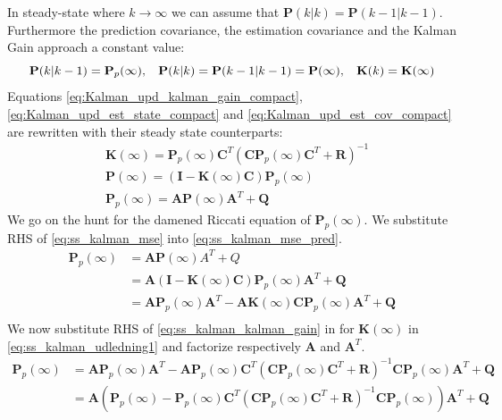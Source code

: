 In steady-state where $k \rightarrow \infty$ we can assume that $\textbf{P}(k|k) = \textbf{P}(k-1|k-1) $. Furthermore the prediction covariance, the estimation covariance and the Kalman Gain approach a constant value:
\begin{equation}
	\textbf{P}(k|k-1) =  \textbf{P}_p(\infty), \hspace{3mm} \textbf{P}(k|k) = \textbf{P}(k-1|k-1) = \textbf{P}(\infty),  \hspace{3mm} \textbf{K}(k) = \textbf{K}(\infty)
\end{equation}
Equations \cref{eq:Kalman_upd_kalman_gain_compact}, \cref{eq:Kalman_upd_est_state_compact} and \cref{eq:Kalman_upd_est_cov_compact} are rewritten with their steady state counterparts:
\begin{align}
	& \textbf{K}(\infty) = \textbf{P}_p(\infty) \textbf{C}^T (\textbf{C} \textbf{P}_p	(\infty) \textbf{C}^T + \textbf{R})^{-1} \label{eq:ss_kalman_kalman_gain} \\
	& \textbf{P}(\infty) = (\textbf{I} - \textbf{K}(\infty) \textbf{C}) \textbf{P}_p(\infty) \label{eq:ss_kalman_mse} \\
	& \textbf{P}_p(\infty) = \textbf{A}\textbf{P}(\infty)\textbf{A}^T + \textbf{Q} \label{eq:ss_kalman_mse_pred}
\end{align}
We go on the hunt for the damened Riccati equation of $\textbf{P}_p(\infty)$. We substitute RHS of \cref{eq:ss_kalman_mse} into \cref{eq:ss_kalman_mse_pred}.
\begin{equation}
	\begin{split}\label{eq:ss_kalman_udledning1}
		\textbf{P}_p(\infty) 	& = \textbf{A}\textbf{P}(\infty)A^T + Q \\
		& = \textbf{A} (\textbf{I}-\textbf{K}(\infty)\textbf{C}) \textbf{P}_p(\infty) \textbf{A}^T + \textbf{Q}\\
		& = \textbf{A} \textbf{P}_p(\infty) \textbf{A}^T - \textbf{A} \textbf{K}(\infty) \textbf{C} \textbf{P}_p(\infty)  \textbf{A}^T + \textbf{Q}\\
		\end{split}
\end{equation}
We now substitute RHS of \cref{eq:ss_kalman_kalman_gain} in for $\textbf{K}(\infty)$ in \cref{eq:ss_kalman_udledning1} and factorize respectively $\textbf{A}$ and $ \textbf{A}^T $.
\begin{equation}
	\begin{split}\label{eq:ss_kalman_udledning2}
		\textbf{P}_p(\infty) & = \textbf{A} \textbf{P}_p(\infty) \textbf{A}^T - \textbf{A} \textbf{P}_p(\infty) \textbf{C}^T (\textbf{C} \textbf{P}_p(\infty) \textbf{C}^T + \textbf{R})^{-1} \textbf{C} \textbf{P}_p(\infty) \textbf{A}^T + \textbf{Q}\\
		& = \textbf{A} (\textbf{P}_p(\infty) - \textbf{P}_p(\infty) \textbf{C}^T (\textbf{C} \textbf{P}_p(\infty) \textbf{C}^T + \textbf{R})^{-1} \textbf{C} \textbf{P}_p(\infty)) \textbf{A}^T + \textbf{Q}\\
	\end{split}
\end{equation}
